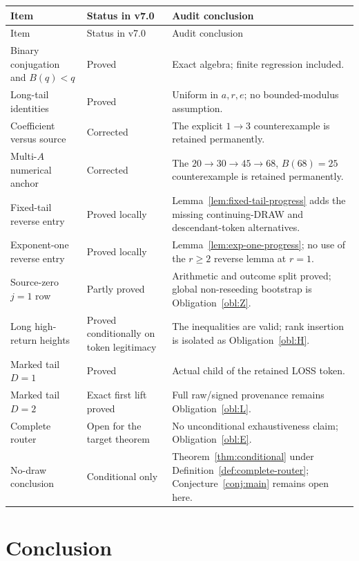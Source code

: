 \renewcommand{\arraystretch}{1.18}
\begin{longtable}{>{\raggedright\arraybackslash}p{}
                  >{\raggedright\arraybackslash}p{}
                  >{\raggedright\arraybackslash}p{}}
\toprule
Item & Status in v7.0 & Audit conclusion \\
\midrule
\endfirsthead
\toprule
Item & Status in v7.0 & Audit conclusion \\
\midrule
\endhead
Binary conjugation and $B(q)<q$ & Proved & Exact algebra; finite regression included. \\
Long-tail identities & Proved & Uniform in $a,r,e$; no bounded-modulus assumption. \\
Coefficient versus source & Corrected & The explicit $1\to3$ counterexample is retained permanently. \\
Multi-$A$ numerical anchor & Corrected & The $20\to30\to45\to68$, $B(68)=25$ counterexample is retained permanently. \\
Fixed-tail reverse entry & Proved locally & Lemma~\ref{lem:fixed-tail-progress} adds the missing continuing-DRAW and descendant-token alternatives. \\
Exponent-one reverse entry & Proved locally & Lemma~\ref{lem:exp-one-progress}; no use of the $r\ge2$ reverse lemma at $r=1$. \\
Source-zero $j=1$ row & Partly proved & Arithmetic and outcome split proved; global non-reseeding bootstrap is Obligation~\ref{obl:Z}. \\
Long high-return heights & Proved conditionally on token legitimacy & The inequalities are valid; rank insertion is isolated as Obligation~\ref{obl:H}. \\
Marked tail $D=1$ & Proved & Actual child of the retained LOSS token. \\
Marked tail $D=2$ & Exact first lift proved & Full raw/signed provenance remains Obligation~\ref{obl:L}. \\
Complete router & Open for the target theorem & No unconditional exhaustiveness claim; Obligation~\ref{obl:E}. \\
No-draw conclusion & Conditional only & Theorem~\ref{thm:conditional} under
Definition~\ref{def:complete-router}; Conjecture~\ref{conj:main} remains
open here. \\
\bottomrule
\end{longtable}

\section{Conclusion}

